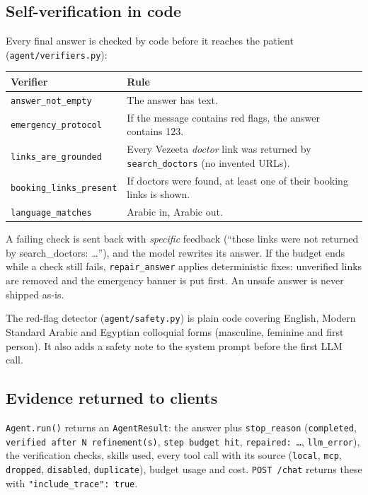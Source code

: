 \documentclass[11pt,a4paper]{article}
\newcommand{\code}[1]{\texttt{#1}}
\begin{document}
\subsection{Self-verification in code}
Every final answer is checked by code before it reaches the patient (\code{agent/verifiers.py}):

\begin{center}\small
\begin{tabularx}{\linewidth}{@{}lY@{}}
\toprule
\textbf{Verifier} & \textbf{Rule} \\
\midrule
\code{answer\_not\_empty} & The answer has text. \\
\code{emergency\_protocol} & If the message contains red flags, the answer contains 123. \\
\code{links\_are\_grounded} & Every Vezeeta \emph{doctor} link was returned by \code{search\_doctors} (no invented URLs). \\
\code{booking\_links\_present} & If doctors were found, at least one of their booking links is shown. \\
\code{language\_matches} & Arabic in, Arabic out. \\
\bottomrule
\end{tabularx}
\end{center}

A failing check is sent back with \emph{specific} feedback (``these links were not returned by search\_doctors: \ldots''), and the model rewrites its answer. If the budget ends while a check still fails, \code{repair\_answer} applies deterministic fixes: unverified links are removed and the emergency banner is put first. An unsafe answer is never shipped as-is.

The red-flag detector (\code{agent/safety.py}) is plain code covering English, Modern Standard Arabic and Egyptian colloquial forms (masculine, feminine and first person). It also adds a safety note to the system prompt before the first LLM call.

\subsection{Evidence returned to clients}
\code{Agent.run()} returns an \code{AgentResult}: the answer plus \code{stop\_reason} (\code{completed}, \code{verified after N refinement(s)}, \code{step budget hit}, \code{repaired: \ldots}, \code{llm\_error}), the verification checks, skills used, every tool call with its source (\code{local}, \code{mcp}, \code{dropped}, \code{disabled}, \code{duplicate}), budget usage and cost. \code{POST /chat} returns these with \code{"include\_trace": true}.
\end{document}
